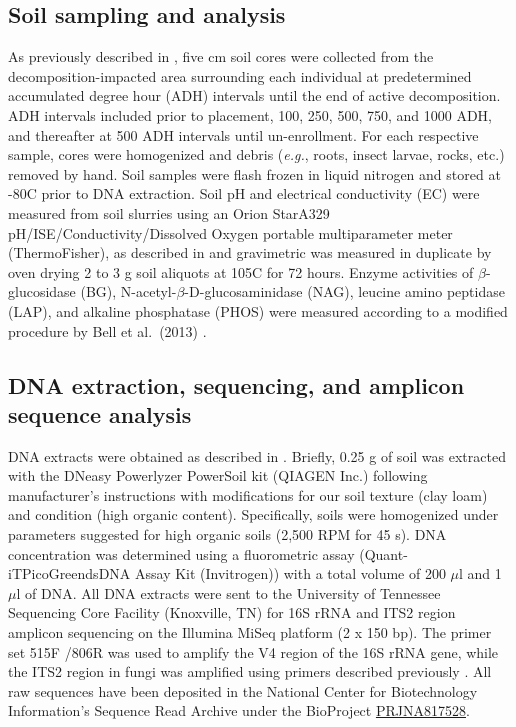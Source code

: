 \documentclass[
  10pt,
  letterpaper,
]{article}
\begin{document}
\hypertarget{soil-sampling-and-analysis}{%
\subsection{Soil sampling and
analysis}\label{soil-sampling-and-analysis}}

As previously described in \citep{mason_body_2022}, five cm soil cores
were collected from the decomposition-impacted area surrounding each
individual at predetermined accumulated degree hour (ADH) intervals
until the end of active decomposition. ADH intervals included prior to
placement, 100, 250, 500, 750, and 1000 ADH, and thereafter at 500 ADH
intervals until un-enrollment. For each respective sample, cores were
homogenized and debris (\emph{e.g.}, roots, insect larvae, rocks, etc.)
removed by hand. Soil samples were flash frozen in liquid nitrogen and
stored at -80\textdegree C prior to DNA extraction. Soil pH and
electrical conductivity (EC) were measured from soil slurries using an
Orion Star\texttrademark  A329 pH/ISE/Conductivity/Dissolved Oxygen
portable multiparameter meter (ThermoFisher), as described in
\citep{mason_body_2022} and gravimetric was measured in duplicate by
oven drying 2 to 3 g soil aliquots at 105\textdegree C for 72 hours.
Enzyme activities of \(\beta\)-glucosidase (BG),
N-acetyl-\(\beta\)-D-glucosaminidase (NAG), leucine amino peptidase
(LAP), and alkaline phosphatase (PHOS) were measured according to a
modified procedure by Bell et al.~(2013)
\citep{mason_body_2022, bell_high-throughput_2013}.

\hypertarget{dna-extraction-sequencing-and-amplicon-sequence-analysis}{%
\subsection{DNA extraction, sequencing, and amplicon sequence
analysis}\label{dna-extraction-sequencing-and-amplicon-sequence-analysis}}

DNA extracts were obtained as described in \citep{mason_body_2022}.
Briefly, 0.25 g of soil was extracted with the DNeasy Powerlyzer
PowerSoil kit (QIAGEN Inc.) following manufacturer's instructions with
modifications for our soil texture (clay loam) and condition (high
organic content). Specifically, soils were homogenized under parameters
suggested for high organic soils (2,500 RPM for 45 s). DNA concentration
was determined using a fluorometric assay
(Quant-iT\texttrademark  PicoGreen\textregistered  dsDNA Assay Kit
(Invitrogen)) with a total volume of 200 \(\mu\)l and 1 \(\mu\)l of DNA.
All DNA extracts were sent to the University of Tennessee Sequencing
Core Facility (Knoxville, TN) for 16S rRNA and ITS2 region amplicon
sequencing on the Illumina MiSeq platform (2 x 150 bp). The primer set
515F \citep{parada_every_2016} /806R \citep{apprill_minor_2015} was used
to amplify the V4 region of the 16S rRNA gene, while the ITS2 region in
fungi was amplified using primers described previously
\citep{mason_body_2022, cregger_populus_2018}. All raw sequences have
been deposited in the National Center for Biotechnology Information's
Sequence Read Archive under the BioProject
\href{https://www.ncbi.nlm.nih.gov/bioproject/?term=PRJNA817528}{PRJNA817528}.
\end{document}
